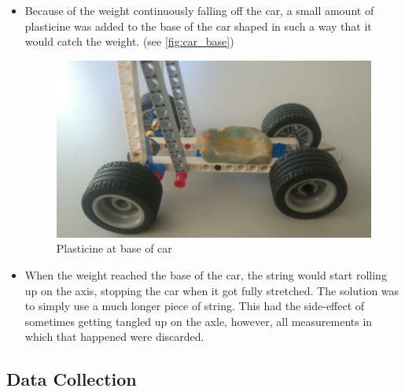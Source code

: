 \documentclass[titlepage,12pt]{article}
\let\oldsubsection\subsection
\renewcommand\subsection{\FloatBarrier \oldsubsection}
\begin{document}
\begin{itemize}
    \item Because of the weight continuously falling off the car, a small amount of
        plasticine was added to the base of the car shaped in such a way that it would catch
        the weight. (see \autoref{fig:car_base})
        \begin{figure}
            \centering
            \includegraphics[width=\textwidth]{photo_base.jpg}
            \caption{Plasticine at base of car}
            \label{fig:car_base}
        \end{figure}

    \item When the weight reached the base of the car, the string would start rolling up on
        the axis, stopping the car when it got fully stretched. The solution was to simply
        use a much longer piece of string. This had the side-effect of sometimes getting
        tangled up on the axle, however, all measurements in which that happened were
        discarded.
\end{itemize}

\subsection{Data Collection}
\end{document}
